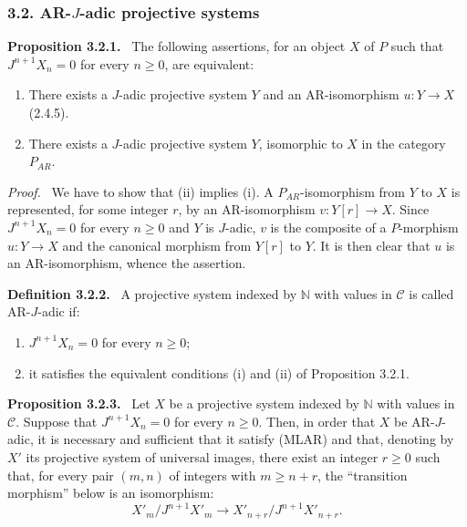 \documentclass[11pt]{article}
\providecommand{\NN}{\mathbb{N}}
\newenvironment{statement}[1]{\par\medskip\noindent\textbf{#1.}\ }{\par\medskip}
\newenvironment{prooftext}[1][Proof]{\par\noindent\emph{#1.}\ }{\par\medskip}
\providecommand{\NN}{\mathbb N}
\providecommand{\cC}{\mathcal C}
\providecommand{\cC}{\mathcal C}
\begin{document}
\subsubsection*{3.2. AR-$J$-adic projective systems}
\begin{statement}{Proposition 3.2.1}
The following assertions, for an object $X$ of $P$ such that $J^{n+1}X_n=0$ for every $n\ge0$, are equivalent:
\begin{enumerate}[label=(\roman*)]
\item There exists a $J$-adic projective system $Y$ and an AR-isomorphism $u:Y\to X$ (2.4.5).
\item There exists a $J$-adic projective system $Y$, isomorphic to $X$ in the category $P_{AR}$.
\end{enumerate}
\end{statement}

\begin{prooftext}[Proof]
We have to show that (ii) implies (i). A $P_{AR}$-isomorphism from $Y$ to $X$ is represented, for some integer $r$, by an AR-isomorphism $v:Y[r]\to X$. Since $J^{n+1}X_n=0$ for every $n\ge0$ and $Y$ is $J$-adic, $v$ is the composite of a $P$-morphism $u:Y\to X$ and the canonical morphism from $Y[r]$ to $Y$. It is then clear that $u$ is an AR-isomorphism, whence the assertion.
\end{prooftext}

\begin{statement}{Definition 3.2.2}
A projective system indexed by $\NN$ with values in $\cC$ is called AR-$J$-adic if:
\begin{enumerate}[label=(\alph*)]
\item $J^{n+1}X_n=0$ for every $n\ge0$;
\item it satisfies the equivalent conditions (i) and (ii) of Proposition 3.2.1.
\end{enumerate}
\end{statement}

\begin{statement}{Proposition 3.2.3}
Let $X$ be a projective system indexed by $\NN$ with values in $\cC$. Suppose that $J^{n+1}X_n=0$ for every $n\ge0$. Then, in order that $X$ be AR-$J$-adic, it is necessary and sufficient that it satisfy (MLAR) and that, denoting by $X'$ its projective system of universal images, there exist an integer $r\ge0$ such that, for every pair $(m,n)$ of integers with $m\ge n+r$, the ``transition morphism'' below is an isomorphism:
\[
X'_m/J^{n+1}X'_m\longrightarrow X'_{n+r}/J^{n+1}X'_{n+r}.
\]
\end{statement}
\end{document}
